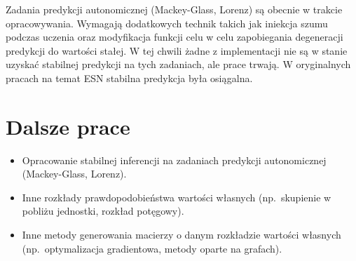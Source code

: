 \documentclass[12pt, a4paper]{article}
\begin{document}
Zadania predykcji autonomicznej (Mackey-Glass, Lorenz) są obecnie w trakcie opracowywania. Wymagają dodatkowych technik takich jak iniekcja szumu podczas uczenia oraz modyfikacja funkcji celu w celu zapobiegania degeneracji predykcji do wartości stałej. W tej chwili żadne z implementacji nie są w stanie uzyskać stabilnej predykcji na tych zadaniach, ale prace trwają. W oryginalnych pracach na temat ESN stabilna predykcja była osiągalna.

\section{Dalsze prace}

\begin{itemize}
    \item Opracowanie stabilnej inferencji na zadaniach predykcji autonomicznej (Mackey-Glass, Lorenz).
    \item Inne rozkłady prawdopodobieństwa wartości własnych (np.\ skupienie w pobliżu jednostki, rozkład potęgowy).
    \item Inne metody generowania macierzy o danym rozkładzie wartości własnych (np.\ optymalizacja gradientowa, metody oparte na grafach).
\end{itemize}
\end{document}
